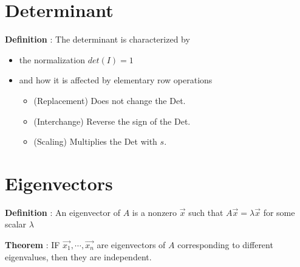 \documentclass{article}
\begin{document}
\section{Determinant}

{
\textbf{Definition} : 
The determinant is characterized by
\begin{itemize}
    \item the normalization $det(I)=1$
    \item and how it is affected by elementary row operations
    \begin{itemize}
        \item (Replacement) Does not change the Det.
        \item (Interchange) Reverse the sign of the Det.
        \item (Scaling) Multiplies the Det with $s$.
    \end{itemize}
\end{itemize}

}
\section{Eigenvectors}

{
\textbf{Definition} : 
An eigenvector of $A$ is a nonzero $\vec{x}$ such that $A\vec{x}= \lambda\vec{x}$ for some scalar $\lambda$

\textbf{Theorem} : 
IF $\vec{x_1}, \cdots , \vec{x_n}$ are eigenvectors of $A$ corresponding to different eigenvalues, then they are independent.

}
\end{document}
